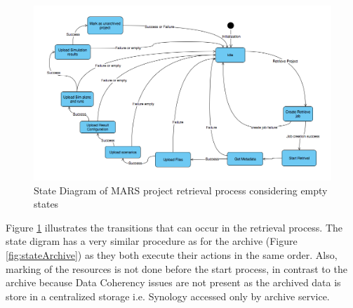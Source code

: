     \begin{figure}[H]
        \centering \includegraphics[scale=0.45]{grafiken/stateRestore.png}
        \caption{State Diagram of MARS project retrieval process considering empty states}
        \label{fig:stateRestore}
    \end{figure}

    Figure \ref{fig:stateRestore} illustrates the transitions that can occur in the retrieval process. The state digram has a very similar procedure as for the
    archive (Figure \ref{fig:stateArchive}) as they both execute their actions in the same order. 
    Also, marking of the resources is not done before the start process, in contrast to the archive because Data Coherency issues are not present as the archived
    data is store in a centralized storage i.e. Synology accessed only by archive service.   

    
